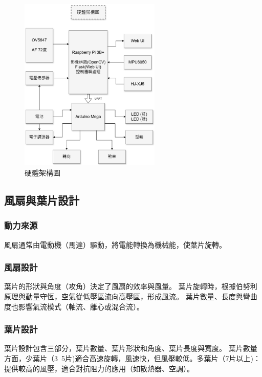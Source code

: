 \documentclass[12pt]{article}       %
\begin{document}
\begin{figure}[H]
    \centering
    \includegraphics[width=0.6\textwidth]{7.jpg}     %
    \caption{硬體架構圖}    %
    \label{fig:7}    %
\end{figure}
\subsection{風扇與葉片設計} 

\subsubsection{動力來源}
\hspace{2em}風扇通常由電動機（馬達）驅動，將電能轉換為機械能，使葉片旋轉。

\subsubsection{風扇設計}
\hspace{2em}葉片的形狀與角度（攻角）決定了風扇的效率與風量。
葉片旋轉時，根據伯努利原理與動量守恆，空氣從低壓區流向高壓區，形成風流。
葉片數量、長度與彎曲度也影響氣流模式（軸流、離心或混合流）。

\subsubsection{葉片設計}
\hspace{2em}葉片設計包含三部分，葉片數量、葉片形狀和角度、葉片長度與寬度。
葉片數量方面，少葉片（3~5片)適合高速旋轉，風速快，但風壓較低。多葉片（7片以上)：提供較高的風壓，適合對抗阻力的應用（如散熱器、空調）。
\end{document}

